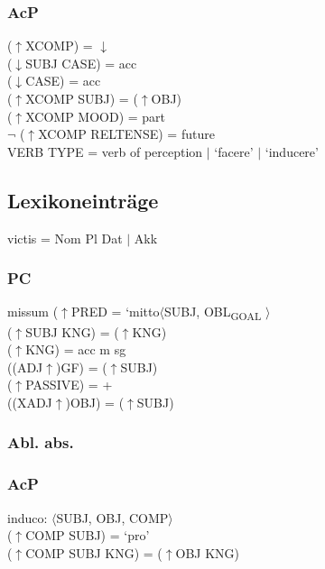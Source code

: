 \documentclass[12pt,a4paper]{article}
\begin{document}
\subsubsection{AcP}

($\uparrow$XCOMP) = $\downarrow$\\
($\downarrow$SUBJ CASE) = acc\\
($\downarrow$CASE) = acc\\
($\uparrow$XCOMP SUBJ) = ($\uparrow$OBJ)\\
($\uparrow$XCOMP MOOD) = part\\
$\neg$ ($\uparrow$XCOMP RELTENSE) = future\\
VERB TYPE = verb of perception $\mid$ `facere' $\mid$ `inducere'

\subsection{Lexikoneinträge}

victis = Nom Pl Dat $\mid$ Akk
\subsubsection{PC}

missum ($\uparrow$PRED = `mitto$\langle$SUBJ, OBL\textsubscript{GOAL} $\rangle$\\
($\uparrow$SUBJ KNG) = ($\uparrow$KNG)\\
($\uparrow$KNG) = acc m sg \\
((ADJ$\uparrow$)GF) = ($\uparrow$SUBJ) \\
($\uparrow$PASSIVE) = + \\
((XADJ$\uparrow$)OBJ) = ($\uparrow$SUBJ) \\



\subsubsection{Abl. abs.}



\subsubsection{AcP}

induco: $\langle$SUBJ, OBJ, COMP$\rangle$\\
($\uparrow$COMP SUBJ) = `pro'\\
($\uparrow$COMP SUBJ KNG) = ($\uparrow$OBJ KNG)\\
\end{document}
